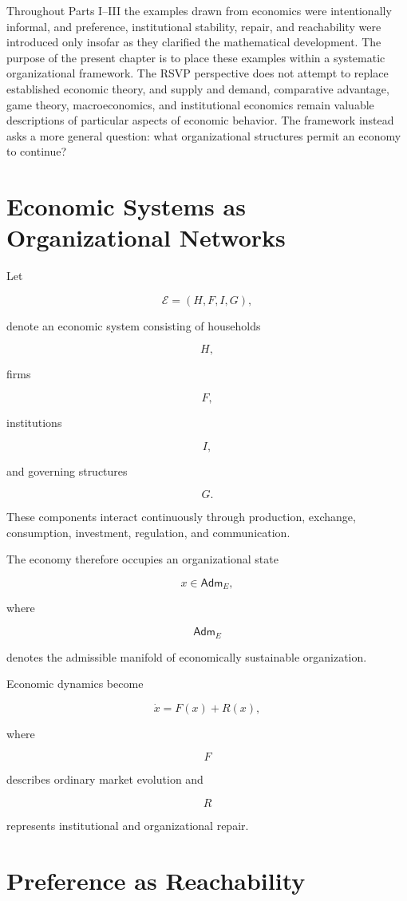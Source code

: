\documentclass[11pt,oneside]{book}
\numberwithin{equation}{chapter}
\theoremstyle{definition}
\theoremstyle{plain}
\newcommand{\Adm}{\mathsf{Adm}}
\begin{document}
Throughout Parts I--III the examples drawn from economics were intentionally informal, and preference, institutional stability, repair, and reachability were introduced only insofar as they clarified the mathematical development. The purpose of the present chapter is to place these examples within a systematic organizational framework. The RSVP perspective does not attempt to replace established economic theory, and supply and demand, comparative advantage, game theory, macroeconomics, and institutional economics remain valuable descriptions of particular aspects of economic behavior. The framework instead asks a more general question: what organizational structures permit an economy to continue?

\section{Economic Systems as Organizational Networks}

Let

\[
\mathcal E
=
(H,F,I,G),
\]

denote an economic system consisting of households

\[
H,
\]

firms

\[
F,
\]

institutions

\[
I,
\]

and governing structures

\[
G.
\]

These components interact continuously through production, exchange,
consumption, investment, regulation, and communication.

The economy therefore occupies an organizational state

\[
x
\in
\Adm_E,
\]

where

\[
\Adm_E
\]

denotes the admissible manifold of economically sustainable organization.

Economic dynamics become

\[
\dot x
=
F(x)
+
R(x),
\]

where

\[
F
\]

describes ordinary market evolution and

\[
R
\]

represents institutional and organizational repair.

\section{Preference as Reachability}
\end{document}
